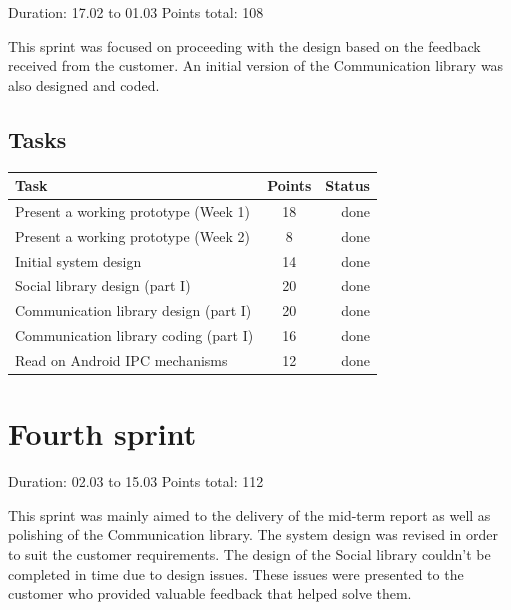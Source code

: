 Duration: 17.02 to 01.03
Points total: 108

This sprint was focused on proceeding with the design based on the
feedback received from the customer. An initial version of the Communication
library was also designed and coded.

\subsection{Tasks}

\begin{table}[ht!]
\begin{tabular}{ | l | c | r | }

\hline
\textbf{Task} & \textbf{Points} & \textbf{Status} \\
\hline

Present a working prototype (Week 1)		& 18 & done \\
\hline
Present a working prototype (Week 2)		& 8  & done \\
\hline
Initial system design						& 14 & done \\
\hline
Social library design (part I)				& 20 & done \\
\hline
Communication library design (part I)		& 20 & done \\
\hline
Communication library coding (part I) 		& 16 & done \\
\hline
Read on Android IPC mechanisms				& 12 & done \\
\hline

\end{tabular}
\end{table}


\newpage


\section{Fourth sprint}

Duration: 02.03 to 15.03
Points total: 112

This sprint was mainly aimed to the delivery of the mid-term report as well
as polishing of the Communication library. The system design was revised in
order to suit the customer requirements. The design of the Social library couldn't
be completed in time due to design issues. These issues were presented to the
customer who provided valuable feedback that helped solve them.


